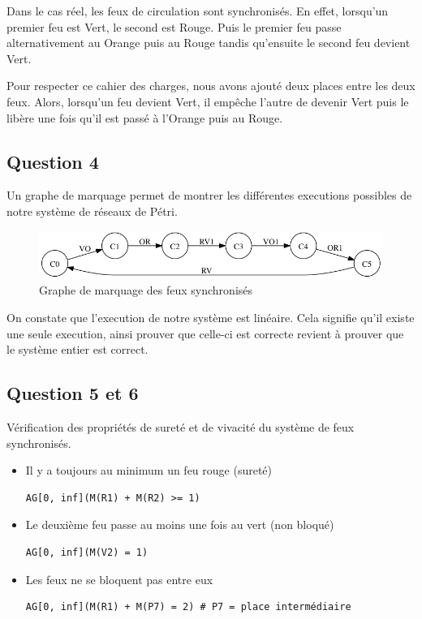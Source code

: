 \documentclass[11pt]{article}
\begin{document}
Dans le cas réel, les feux de circulation sont synchronisés. En effet, lorsqu'un premier feu est Vert, le second est Rouge. Puis le premier feu passe alternativement au Orange puis au Rouge tandis qu'ensuite le second feu devient Vert.

Pour respecter ce cahier des charges, nous avons ajouté deux places entre les deux feux. Alors, lorsqu'un feu devient Vert, il empêche l'autre de devenir Vert puis le libère une fois qu'il est passé à l'Orange puis au Rouge.
 
\subsection{Question 4}

Un graphe de marquage permet de montrer les différentes executions possibles de notre système de réseaux de Pétri.

\begin{figure}[H]
	\centering
	\includegraphics[scale=0.5]{ressources/part1/traitement-question4/graphe.png}
	\caption{Graphe de marquage des feux synchronisés}
\end{figure}

On constate que l'execution de notre système est linéaire. Cela signifie qu'il existe une seule execution, ainsi prouver que celle-ci est correcte revient à prouver que le système entier est correct.

\subsection{Question 5 et 6}

Vérification des propriétés de sureté et de vivacité du système de feux synchronisés.

\begin{itemize}
	\item Il y a toujours au minimum un feu rouge (sureté)
\begin{verbatim}
AG[0, inf](M(R1) + M(R2) >= 1)	
\end{verbatim}

	\item Le deuxième feu passe au moins une fois au vert (non bloqué)
\begin{verbatim}
AG[0, inf](M(V2) = 1)	
\end{verbatim}

	\item Les feux ne se bloquent pas entre eux
\begin{verbatim}
AG[0, inf](M(R1) + M(P7) = 2) # P7 = place intermédiaire	
\end{verbatim}
\end{itemize}
\end{document}
